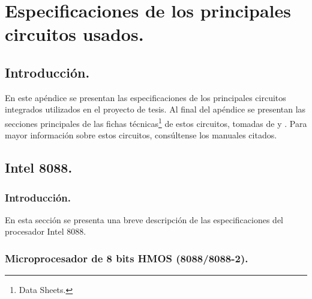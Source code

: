 \chapter[Especificaciones de los principales circuitos usados.]{Especificaciones de los %
principales circuitos usados.}
\label{Apendice:chips}


\fancyhead[LE,RO]{\thepage}


\section{Introducci\'on.}
\label{Section:introchips}

En este ap\'endice se presentan las especificaciones de los principales circuitos integrados %
utilizados en el proyecto de tesis. Al final del ap\'endice se presentan las secciones %
principales de las fichas t\'ecnicas\footnote{Data Sheets.} de estos circuitos, tomadas de %
\cite{Intel:Micro} y \cite{Intel:Perif}. Para mayor informaci\'on sobre estos circuitos, %
cons\'ultense los manuales citados.


\section{Intel 8088.}
\label{Section:8088}


\subsection{Introducci\'on.} 
\label{Subsection:intro8088}

En esta secci\'on se presenta una breve descripci\'on de las especificaciones del procesador %
Intel 8088. 


\subsection{Mi\-cro\-pro\-ce\-sa\-dor de 8 bits HMOS (8088/8088-2).}
\label{Subsection:micro8088}

